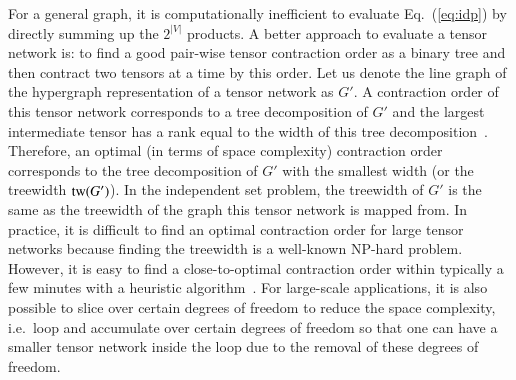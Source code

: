 \documentclass[onefignum, onetabnum]{siamart190516}
\newcommand{\<}{\langle}
\renewcommand{\>}{\rangle}
\newcommand{\Eq}[1]{Eq.~(\ref{#1})}
\begin{document}
For a general graph, it is computationally inefficient to evaluate \Eq{eq:idp} by directly summing up the $2^{|V|}$ products.
A better approach to evaluate a tensor network is: to find a good pair-wise tensor contraction order as a binary tree and then contract two tensors at a time by this order.
Let us denote the line graph of the hypergraph representation of a tensor network as $G'$.
A contraction order of this tensor network corresponds to a tree decomposition of $G'$ and the largest intermediate tensor has a rank equal to the width of this tree decomposition~\cite{Markov2008}.
Therefore, an optimal (in terms of space complexity) contraction order corresponds to the tree decomposition of $G'$ with the smallest width (or the treewidth ${\rm tw}(G')$).
In the independent set problem, the treewidth of $G'$ is the same as the treewidth of the graph this tensor network is mapped from. 
In practice, it is difficult to find an optimal contraction order for large tensor networks because finding the treewidth is a well-known NP-hard problem.
However, it is easy to find a close-to-optimal contraction order within typically a few minutes with a heuristic algorithm~\cite{Kourtis2019, Kalachev2021}.
For large-scale applications, it is also possible to slice over certain degrees of freedom to reduce the space complexity, i.e.\
loop and accumulate over certain degrees of freedom so that one can have a smaller tensor network inside the loop due to the removal of these degrees of freedom.
\end{document}
